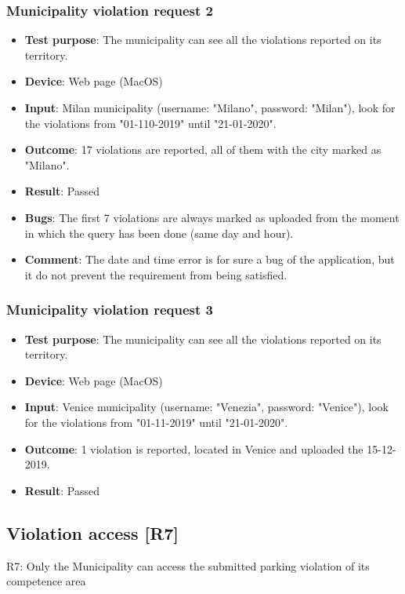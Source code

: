 \documentclass[../ATD.tex]{subfiles}
\begin{document}
    \subsubsection{Municipality violation request 2}\label{subsubsec:municiplaity-violation-request-2}
    \begin{itemize}
        \item \textbf{Test purpose}: The municipality can see all the violations reported on its territory.
        \item \textbf{Device}: Web page (MacOS)
        \item \textbf{Input}: Milan municipality (username: "Milano", password: "Milan"), look for the violations from "01-110-2019" until "21-01-2020".
        \item \textbf{Outcome}: 17 violations are reported, all of them with the city marked as "Milano".
        \item \textbf{Result}: Passed
        \item \textbf{Bugs}: The first 7 violations are always marked as uploaded from the moment in which the query has been done (same day and hour).
        \item \textbf{Comment}: The date and time error is for sure a bug of the application, but it do not prevent the requirement from being satisfied.
    \end{itemize}

    \subsubsection{Municipality violation request 3}\label{subsubsec:municiplaity-violation-request-3}
    \begin{itemize}
        \item \textbf{Test purpose}: The municipality can see all the violations reported on its territory.
        \item \textbf{Device}: Web page (MacOS)
        \item \textbf{Input}: Venice municipality (username: "Venezia", password: "Venice"), look for the violations from "01-11-2019" until "21-01-2020".
        \item \textbf{Outcome}: 1 violation is reported, located in Venice and uploaded the 15-12-2019.
        \item \textbf{Result}: Passed
    \end{itemize}

    \subsection{Violation access [R7]}\label{subsec:violation-access-1}
    R7: Only the Municipality can access the submitted parking violation of its competence area
\end{document}
